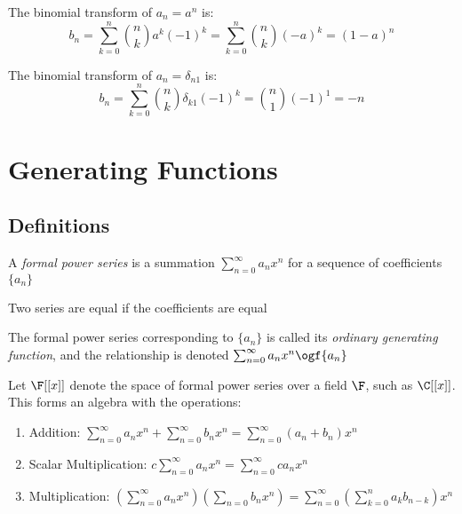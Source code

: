 \documentclass[a4paper]{article}
\begin{document}
\begin{example}
The binomial transform of $a_n=a^n$ is:
\begin{equation*}
b_n=\sum_{k=0}^n\binom nka^k(-1)^k=\sum_{k=0}^n\binom nk(-a)^k=(1-a)^n
\end{equation*}
\end{example}

\begin{example}
The binomial transform of $a_n=\delta_{n1}$ is:
\begin{equation*}
b_n=\sum_{k=0}^n\binom nk\delta_{k1}(-1)^k=\binom n1(-1)^1=-n
\end{equation*}
\end{example}

\section{Generating Functions}

\subsection{Definitions}

\begin{definition}
A \emph{formal power series} is a summation $\sum_{n=0}^\infty a_nx^n$ for a sequence of coefficients $\{a_n\}$
\begin{arrows}
\item Two series are equal if the coefficients are equal
\item The formal power series corresponding to $\{a_n\}$ is called its \emph{ordinary generating function}, and the relationship is denoted $\sum_{n=0}^\infty a_nx^n\ogf \{a_n\}$
\end{arrows}
\end{definition}

\begin{proposition}
Let $\F[[x]]$ denote the space of formal power series over a field $\F$, such as $\C[[x]]$. This forms an algebra with the operations:
\begin{enumerate}[label=(\roman*)]
\item Addition: $\displaystyle\sum_{n=0}^\infty a_nx^n+\sum_{n=0}^\infty b_nx^n=\sum_{n=0}^\infty(a_n+b_n)x^n$
\item Scalar Multiplication: $\displaystyle c\sum_{n=0}^\infty a_nx^n=\sum_{n=0}^\infty ca_nx^n$
\item Multiplication: $\displaystyle\left(\sum_{n=0}^\infty a_nx^n\right)\left(\sum_{n=0}b_nx^n\right)=\sum_{n=0}^\infty\left(\sum_{k=0}^na_kb_{n-k}\right)x^n$
\end{enumerate}
\end{proposition}
\end{document}
